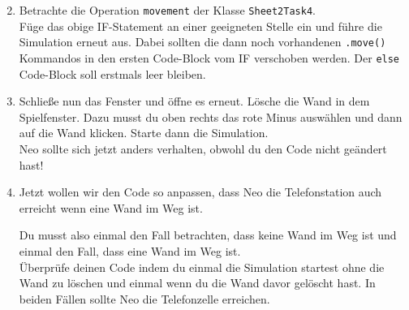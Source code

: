 \begin{enumerate} \setcounter{enumi}{1}
    \item Betrachte die Operation \lstinline{movement} der Klasse \lstinline{Sheet2Task4}.\\
        Füge das obige IF-Statement an einer geeigneten Stelle ein und führe die Simulation erneut aus.
        Dabei sollten die dann noch vorhandenen \lstinline{.move()} Kommandos in den ersten Code-Block vom IF verschoben werden.
        Der \lstinline{else} Code-Block soll erstmals leer bleiben.
    \item Schließe nun das Fenster und öffne es erneut.
        Lösche die Wand in dem Spielfenster.
        Dazu musst du oben rechts das rote Minus auswählen und dann auf die Wand klicken.
        Starte dann die Simulation.\\
        Neo sollte sich jetzt anders verhalten, obwohl du den Code nicht geändert hast!
    \item Jetzt wollen wir den Code so anpassen, dass Neo die Telefonstation auch erreicht wenn eine Wand im Weg ist.

        Du musst also einmal den Fall betrachten, dass keine Wand im Weg ist und einmal den Fall, dass eine Wand im Weg ist.\\

        Überprüfe deinen Code indem du einmal die Simulation startest ohne die Wand zu löschen und einmal wenn du die Wand davor gelöscht hast.
        In beiden Fällen sollte Neo die Telefonzelle erreichen.

\end{enumerate}
